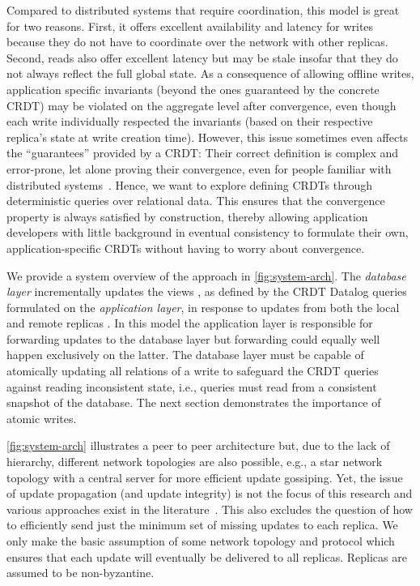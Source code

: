 Compared to distributed systems that require coordination,
this model is great for two reasons.
First, it offers excellent availability and latency for writes because
they do not have to coordinate over the network with other replicas.
Second, reads also offer excellent latency but may be stale insofar that they
do not always reflect the full global state.
As a consequence of allowing offline writes,
application specific invariants (beyond the ones guaranteed by the concrete \ac{CRDT})
may be violated on the aggregate level after convergence,
even though each write individually respected the invariants (based on their
respective replica's state at write creation time).
However, this issue sometimes even affects the ``guarantees'' provided by a \ac{CRDT}:
Their correct definition is complex and error-prone,
let alone proving their convergence, even for people familiar with distributed
systems~\cite{kleppmann2022assessing, gomes2017verifying}.
Hence, we want to explore defining CRDTs through deterministic queries over
relational data.
This ensures that the convergence property is always satisfied by construction,
thereby allowing application developers with little background in eventual
consistency to formulate their own, application-specific \acp{CRDT} without
having to worry about convergence.

We provide a system overview of the approach in \autoref{fig:system-arch}.
The \emph{database layer} incrementally updates the views \deltaO{},
as defined by the CRDT Datalog queries formulated on the \emph{application layer},
in response to updates from both the local  and remote replicas
.
In this model the application layer is responsible for forwarding updates
to the database layer but forwarding could equally well happen exclusively
on the latter.
The database layer must be capable of atomically updating all relations
of a write to safeguard the CRDT queries against reading inconsistent
state, i.e., queries must read from a consistent snapshot of the database.
The next section demonstrates the importance of atomic writes.

\autoref{fig:system-arch} illustrates a peer to peer architecture
but, due to the lack of hierarchy, different network topologies are also possible,
e.g., a star network topology with a central server for more efficient update
gossiping.
Yet, the issue of update propagation (and update integrity) is not the focus
of this research and various approaches exist in the literature~\cite{
	auvolat2019merkle, sanjuan2020merkle, kleppmann2024bluesky,
	kleppmann2022making}.
This also excludes the question of how to efficiently send just the minimum
set of missing updates to each replica.
We only make the basic assumption of some network topology and protocol
which ensures that each update will eventually be delivered to all replicas.
Replicas are assumed to be non-byzantine.


